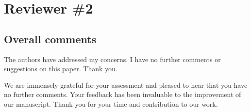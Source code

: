 \section{Reviewer \#2}\label{reviewer_2}

\subsection*{Overall comments}

\RC{} The authors have addressed my concerns. I have no further comments or suggestions on this paper. Thank you.

\AR{} We are immensely grateful for your assessment and pleased to hear that you have no further comments. Your feedback has been invaluable to the improvement of our manuscript. Thank you for your time and contribution to our work.

